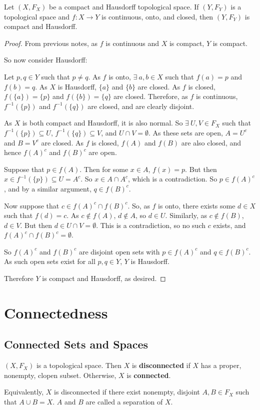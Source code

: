 \begin{theorem}
Let $(X,F_X)$ be a compact and Hausdorff topological space.  If $(Y,F_Y)$ is a topological space and $f : X \to Y$ is continuous, onto, and closed, then $(Y,F_Y)$ is compact and Hausdorff.
\end{theorem}
\begin{proof}
From previous notes, as $f$ is continuous and $X$ is compact, $Y$ is compact.


So now consider Hausdorff:


Let $p,q \in Y$ such that $p \neq q$.  As $f$ is onto, $\exists \ a,b \in X$ such that $f(a) = p$ and $f(b) = q$.  As $X$ is Hausdorff, $\{a\}$ and $\{b\}$ are closed.  As $f$ is closed, $f(\{a\}) = \{p\}$ and $f(\{b\}) = \{q\}$ are closed.  Therefore, as $f$ is continuous, $f^{-1}(\{p\})$ and $f^{-1}(\{q\})$ are closed, and are clearly disjoint.

As $X$ is both compact and Hausdorff, it is also normal.  So $\exists \ U,V \in F_X$ such that $f^{-1}(\{p\}) \subseteq U$, $f^{-1}(\{q\}) \subseteq V$, and $U \cap V = \emptyset$.  As these sets are open, $A = U^c$ and $B = V^c$ are closed.  As $f$ is closed, $f(A)$ and $f(B)$ are also closed, and hence $f(A)^c$ and $f(B)^c$ are open.

Suppose that $p \in f(A)$.  Then for some $x \in A$, $f(x) = p$.  But then $x \in f^{-1}(\{p\}) \subseteq U = A^c$.  So $x \in A \cap A^c$, which is a contradiction.  So $p \in f(A)^c$, and by a similar argument, $q \in f(B)^c$.

Now suppose that $c \in f(A)^c \cap f(B)^c$.  So, as $f$ is onto, there exists some $d \in X$ such that $f(d) = c$.  As $c \notin f(A)$, $d \notin A$, so $d \in U$.  Similarly, as $c \notin f(B)$, $d \in V$.  But then $d \in U \cap V = \emptyset$.  This is a contradiction, so no such $c$ exists, and $f(A)^c \cap f(B)^c = \emptyset$.

So $f(A)^c$ and $f(B)^c$ are disjoint open sets with $p \in f(A)^c$ and $q \in f(B)^c$.  As such open sets exist for all $p,q \in Y$, $Y$ is Hausdorff.

Therefore $Y$ is compact and Hausdorff, as desired.
\end{proof}

\section{Connectedness}
\subsection{Connected Sets and Spaces}
\begin{definition}
$(X,F_X)$ is a topological space.  Then $X$ is \textbf{disconnected} if $X$ has a proper, nonempty, clopen subset.  Otherwise, $X$ is \textbf{connected}.

Equivalently, $X$ is disconnected if there exist nonempty, disjoint $A,B \in F_X$ such that $A \cup B = X$.  $A$ and $B$ are called a separation of $X$.
\end{definition}

